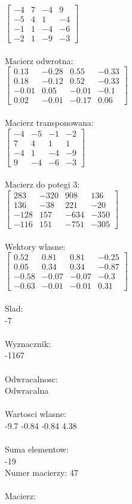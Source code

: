 \documentclass[a4paper,12pt]{article}
\begin{document}
$\begin{bmatrix} -4&7&-4&9\\-5&4&1&-4\\-1&1&-4&-6\\-2&1&-9&-3 \end{bmatrix}$
\\
\\
Macierz odwrotna:\\

$\begin{bmatrix} 0.13&-0.28&0.55&-0.33\\0.18&-0.12&0.52&-0.33\\-0.01&0.05&-0.01&-0.1\\0.02&-0.01&-0.17&0.06 \end{bmatrix}$
\\
\\
Macierz transponowana:\\

$\begin{bmatrix} -4&-5&-1&-2\\7&4&1&1\\-4&1&-4&-9\\9&-4&-6&-3 \end{bmatrix}$
\\
\\
Macierz do potegi 3:\\

$\begin{bmatrix} 283&-320&908&136\\136&-38&221&-20\\-128&157&-634&-350\\-116&151&-751&-305 \end{bmatrix}$
\\
\\
Wektory wlasne:\\

$\begin{bmatrix} 0.52&0.81&0.81&-0.25\\0.05&0.34&0.34&-0.87\\-0.58&-0.07&-0.07&-0.3\\-0.63&-0.01&-0.01&0.31 \end{bmatrix}$
\\
\\
Slad:\\
-7
\\
\\
Wyznacznik:\\
-1167
\\
\\
Odwracalnosc:\\
Odwracalna
\\
\\
Wartosci wlasne:\\
-9.7 -0.84 -0.84 4.38
\\
\\
Suma elementow:\\
-19
\\
\newpage
Numer macierzy:
47
\\
\\
Macierz:\\
\end{document}
